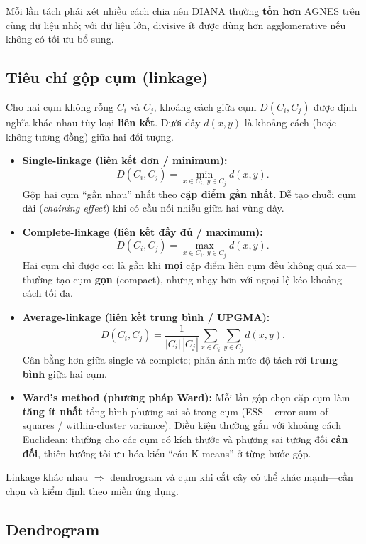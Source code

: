 \documentclass[10pt]{article}
\begin{document}
Mỗi lần tách phải xét nhiều cách chia nên DIANA thường \textbf{tốn hơn} AGNES trên cùng dữ liệu nhỏ; với dữ liệu lớn, divisive ít được dùng hơn agglomerative nếu không có tối ưu bổ sung.

\subsection{Tiêu chí gộp cụm (linkage)}

Cho hai cụm không rỗng $C_i$ và $C_j$, khoảng cách giữa cụm $D(C_i,C_j)$ được định nghĩa khác nhau tùy loại \textbf{liên kết}. Dưới đây $d(x,y)$ là khoảng cách (hoặc không tương đồng) giữa hai đối tượng.

\begin{itemize}
    \item \textbf{Single-linkage (liên kết đơn / minimum):}
    \[
    D(C_i,C_j) = \min_{x \in C_i,\, y \in C_j} d(x,y).
    \]
    Gộp hai cụm ``gần nhau'' nhất theo \textbf{cặp điểm gần nhất}. Dễ tạo chuỗi cụm dài (\textit{chaining effect}) khi có cầu nối nhiễu giữa hai vùng dày.

    \item \textbf{Complete-linkage (liên kết đầy đủ / maximum):}
    \[
    D(C_i,C_j) = \max_{x \in C_i,\, y \in C_j} d(x,y).
    \]
    Hai cụm chỉ được coi là gần khi \textbf{mọi} cặp điểm liên cụm đều không quá xa---thường tạo cụm \textbf{gọn} (compact), nhưng nhạy hơn với ngoại lệ kéo khoảng cách tối đa.

    \item \textbf{Average-linkage (liên kết trung bình / UPGMA):}
    \[
    D(C_i,C_j) = \frac{1}{|C_i|\,|C_j|}\sum_{x \in C_i}\sum_{y \in C_j} d(x,y).
    \]
    Cân bằng hơn giữa single và complete; phản ánh mức độ tách rời \textbf{trung bình} giữa hai cụm.

    \item \textbf{Ward's method (phương pháp Ward):} Mỗi lần gộp chọn cặp cụm làm \textbf{tăng ít nhất} tổng bình phương sai số trong cụm (ESS -- error sum of squares / within-cluster variance). Điều kiện thường gắn với khoảng cách Euclidean; thường cho các cụm có kích thước và phương sai tương đối \textbf{cân đối}, thiên hướng tối ưu hóa kiểu ``cầu K-means'' ở từng bước gộp.
\end{itemize}

Linkage khác nhau $\Rightarrow$ dendrogram và cụm khi cắt cây có thể khác mạnh---cần chọn và kiểm định theo miền ứng dụng.

\subsection{Dendrogram}
\end{document}
